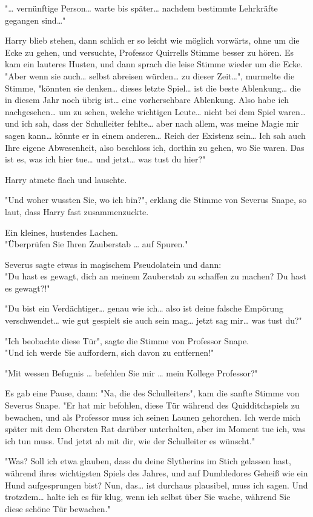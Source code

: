 {"… vernünftige Person… warte bis später… nachdem bestimmte Lehrkräfte gegangen sind…"

Harry blieb stehen, dann schlich er so leicht wie möglich vorwärts, ohne um die Ecke zu gehen, und versuchte, Professor Quirrells Stimme besser zu hören. Es kam ein lauteres Husten, und dann sprach die leise Stimme wieder um die Ecke.\\ "Aber wenn sie auch… selbst abreisen würden… zu dieser Zeit…", murmelte die Stimme, "könnten sie denken… dieses letzte Spiel… ist die beste Ablenkung… die in diesem Jahr noch übrig ist… eine vorhersehbare Ablenkung. Also habe ich nachgesehen… um zu sehen, welche wichtigen Leute… nicht bei dem Spiel waren… und ich sah, dass der Schulleiter fehlte… aber nach allem, was meine Magie mir sagen kann… könnte er in einem anderen… Reich der Existenz sein… Ich sah auch Ihre eigene Abwesenheit, also beschloss ich, dorthin zu gehen, wo Sie waren. Das ist es, was ich hier tue… und jetzt… was tust du hier?"

Harry atmete flach und lauschte.

"Und woher wussten Sie, wo ich bin?", erklang die Stimme von Severus Snape, so laut, dass Harry fast zusammenzuckte.

Ein kleines, hustendes Lachen.\\ "Überprüfen Sie Ihren Zauberstab … auf Spuren."

Severus sagte etwas in magischem Pseudolatein und dann:\\ "Du hast es gewagt, dich an meinem Zauberstab zu schaffen zu machen? Du hast es gewagt?!"

"Du bist ein Verdächtiger… genau wie ich… also ist deine falsche Empörung verschwendet… wie gut gespielt sie auch sein mag… jetzt sag mir… was tust du?"

"Ich beobachte diese Tür", sagte die Stimme von Professor Snape.\\ "Und ich werde Sie auffordern, sich davon zu entfernen!"

"Mit wessen Befugnis … befehlen Sie mir … mein Kollege Professor?"

Es gab eine Pause, dann: "Na, die des Schulleiters", kam die sanfte Stimme von Severus Snape. "Er hat mir befohlen, diese Tür während des Quidditchspiels zu bewachen, und als Professor muss ich seinen Launen gehorchen. Ich werde mich später mit dem Obersten Rat darüber unterhalten, aber im Moment tue ich, was ich tun muss. Und jetzt ab mit dir, wie der Schulleiter es wünscht."

"Was? Soll ich etwa glauben, dass du deine Slytherins im Stich gelassen hast, während ihres wichtigsten Spiels des Jahres, und auf Dumbledores Geheiß wie ein Hund aufgesprungen bist? Nun, das… ist durchaus plausibel, muss ich sagen. Und trotzdem… halte ich es für klug, wenn ich selbst über Sie wache, während Sie diese schöne Tür bewachen."

}
